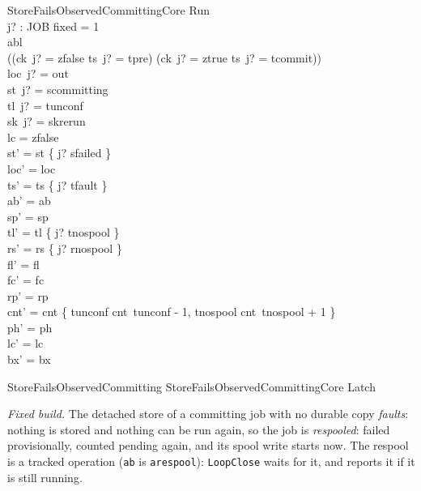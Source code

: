 \documentclass[a4paper,10pt,fleqn]{article}
\newcommand{\field}[1]{\texttt{#1}}
\begin{document}
\begin{schema}{StoreFailsObservedCommittingCore}
\Delta Run \\ j? : JOB
\where
fixed = 1 \\
abl  \\
((ck~j? = zfalse \land ts~j? = tpre) \lor (ck~j? = ztrue \land ts~j? = tcommit)) \\
loc~j? = out \\
st~j? = scommitting \\
tl~j? = tunconf \\
sk~j? = skrerun \\
lc = zfalse \\
st' = st \oplus \{ j? \mapsto sfailed \} \\
loc' = loc \\
ts' = ts \oplus \{ j? \mapsto tfault \} \\
ab' = ab \\
sp' = sp \\
tl' = tl \oplus \{ j? \mapsto tnospool \} \\
rs' = rs \oplus \{ j? \mapsto rnospool \} \\
fl' = fl \\
fc' = fc \\
rp' = rp \\
cnt' = cnt \oplus \{ tunconf \mapsto cnt~tunconf - 1, tnospool \mapsto cnt~tnospool + 1 \} \\
ph' = ph \\
lc' = lc \\
bx' = bx
\end{schema}

\begin{zed}
StoreFailsObservedCommitting  StoreFailsObservedCommittingCore \land Latch
\end{zed}

\emph{Fixed build.} The detached store of a committing job with no durable copy
\emph{faults}: nothing is stored and nothing can be run again, so the job is
\emph{respooled}: failed provisionally, counted pending again, and its spool write
starts now. The respool is a tracked operation (\field{ab} is \field{arespool}):
\field{LoopClose} waits for it, and reports it if it is still running.
\end{document}

